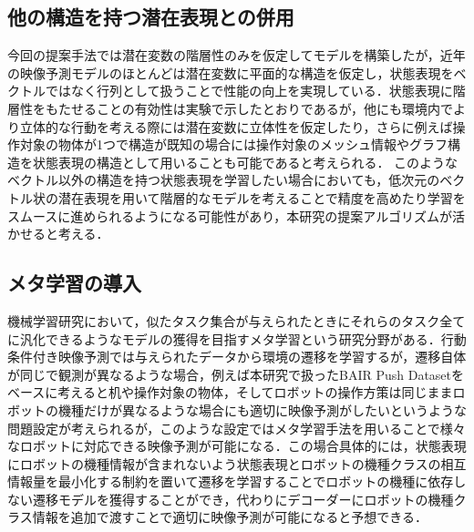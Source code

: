 \subsection{他の構造を持つ潜在表現との併用}
今回の提案手法では潜在変数の階層性のみを仮定してモデルを構築したが，近年の映像予測モデルのほとんどは潜在変数に平面的な構造を仮定し，状態表現をベクトルではなく行列として扱うことで性能の向上を実現している\cite{denton2018stochastic}\cite{villegas2019high}\cite{castrejon2019improved}．状態表現に階層性をもたせることの有効性は実験で示したとおりであるが，他にも環境内でより立体的な行動を考える際には潜在変数に立体性を仮定したり，さらに例えば操作対象の物体が1つで構造が既知の場合には操作対象のメッシュ情報やグラフ構造を状態表現の構造として用いることも可能であると考えられる．
このようなベクトル以外の構造を持つ状態表現を学習したい場合においても，低次元のベクトル状の潜在表現を用いて階層的なモデルを考えることで精度を高めたり学習をスムースに進められるようになる可能性があり，本研究の提案アルゴリズムが活かせると考える．

\subsection{メタ学習の導入}
機械学習研究において，似たタスク集合が与えられたときにそれらのタスク全てに汎化できるようなモデルの獲得を目指すメタ学習という研究分野がある．行動条件付き映像予測では与えられたデータから環境の遷移を学習するが，遷移自体が同じで観測が異なるような場合，例えば本研究で扱ったBAIR Push Datasetをベースに考えると机や操作対象の物体，そしてロボットの操作方策は同じままロボットの機種だけが異なるような場合にも適切に映像予測がしたいというような問題設定が考えられるが，このような設定ではメタ学習手法を用いることで様々なロボットに対応できる映像予測が可能になる．この場合具体的には，状態表現にロボットの機種情報が含まれないよう状態表現とロボットの機種クラスの相互情報量を最小化する制約を置いて遷移を学習することでロボットの機種に依存しない遷移モデルを獲得することができ，代わりにデコーダーにロボットの機種クラス情報を追加で渡すことで適切に映像予測が可能になると予想できる．


